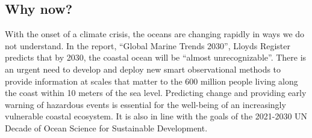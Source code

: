 \documentclass[12pt]{article}
\begin{document}




\subsection{Why now?}

With the onset of a climate crisis, the oceans are changing rapidly in
ways we do not understand. In the report, ``Global Marine Trends
2030'', Lloyds Register predicts that by 2030, the coastal ocean will
be ``almost unrecognizable''. There is an urgent need to develop and
deploy new smart observational methods to provide information at
scales that matter to the 600 million people living along the coast
within 10 meters of the sea level.  Predicting change and providing
early warning of hazardous events is essential for the well-being of
an increasingly vulnerable coastal ecosystem. It is also in line with
the goals of the 2021-2030 UN Decade of Ocean Science for Sustainable
Development.
\end{document}
